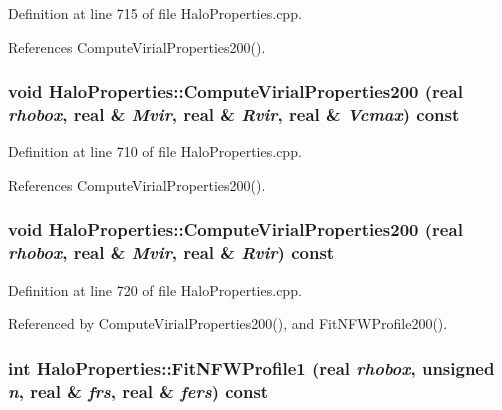 Definition at line 715 of file HaloProperties.cpp.



References ComputeVirialProperties200().

\subsubsection[{ComputeVirialProperties200}]{\setlength{\rightskip}{0pt plus 5cm}void HaloProperties::ComputeVirialProperties200 ({\bf real} {\em rhobox}, \/  {\bf real} \& {\em Mvir}, \/  {\bf real} \& {\em Rvir}, \/  {\bf real} \& {\em Vcmax}) const}\label{classHaloProperties_a21ee7112bdd7d5c77f91bbd3d87a2f7d}


Definition at line 710 of file HaloProperties.cpp.



References ComputeVirialProperties200().

\subsubsection[{ComputeVirialProperties200}]{\setlength{\rightskip}{0pt plus 5cm}void HaloProperties::ComputeVirialProperties200 ({\bf real} {\em rhobox}, \/  {\bf real} \& {\em Mvir}, \/  {\bf real} \& {\em Rvir}) const}\label{classHaloProperties_a6191e30ad371b6cdca9ec054da9c45c6}


Definition at line 720 of file HaloProperties.cpp.



Referenced by ComputeVirialProperties200(), and FitNFWProfile200().

\subsubsection[{FitNFWProfile1}]{\setlength{\rightskip}{0pt plus 5cm}int HaloProperties::FitNFWProfile1 ({\bf real} {\em rhobox}, \/  unsigned {\em n}, \/  {\bf real} \& {\em frs}, \/  {\bf real} \& {\em fers}) const}\label{classHaloProperties_a33a97caec1229a2bb58d7971e8f7f3b0}


